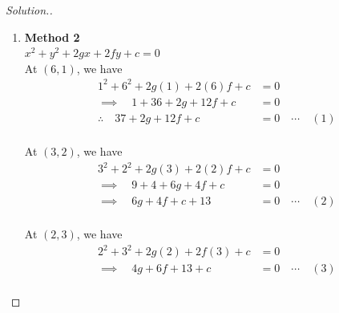 \documentclass[11pt,a4paper]{article}
\theoremstyle{definition}
\newenvironment{solution}
  {\renewcommand{\qedsymbol}{}\begin{proof}[\textit{Solution}.]}
  {\end{proof}}
\begin{document}
\begin{solution}
\begin{enumerate}
Midpoint  of $BC$ is $\quad  \left(\frac{3 + 2}{2}, \frac{2 + 3}{2}\right) = \left(2\frac{1}{2},2\frac{1}{2}\right)$\\

Gradient of $BC =\frac{3 - 2}{2 - 3} = -1$ 


$$\therefore \quad  y - 2\frac{1}{2} = 1\left(x - 2\frac{1}{2}\right)$$

$$\implies \quad  y = x \quad \cdots\quad  (2)$$



\begin{align*}
\text{Now},\qquad  2y - x - 6 & = 0\\
 y & = x\\\\
 \implies \quad  2x - x & = 6
\end{align*}

$$x = 6\quad ,\quad  y = 6$$

$\therefore\quad  (6,6)\,$ is the centre of the circle.

$$r^2 = (6-1)^2 + (6-6)^2 = 25$$

Our equation in standard form is \,$(x  - 6)^2 + (y - 6)^2  = 25$\\




\item[]\textbf{Method 2}\\

$x^2  + y^2 + 2gx + 2fy + c = 0$\\


At $(6,1)$, we have
\begin{align*}
1^2 + 6^2 + 2g(1) + 2(6)f + c & = 0\\
\implies \quad  1 + 36 + 2g + 12f + c & = 0\\
\therefore\quad  37 + 2g + 12f + c & =  0\quad  \cdots\quad  (1)\\
\end{align*}





At $(3,2)$, we have 
\begin{align*}
3^2 +2^2 + 2g(3) + 2(2)f + c & = 0\\
\implies\quad  9 + 4 + 6g + 4f + c & = 0\\
\implies \quad  6g + 4f + c + 13 & = 0\quad  \cdots\quad  (2)\\
\end{align*}



At $(2,3)$, we have
\begin{align*}
2^2 + 3^2 + 2g(2) + 2f(3) + c & = 0\\
\implies \quad  4g + 6f + 13 + c & = 0\quad  \cdots\quad  (3)\\
\end{align*}



\end{enumerate}
\end{solution}
\end{document}
